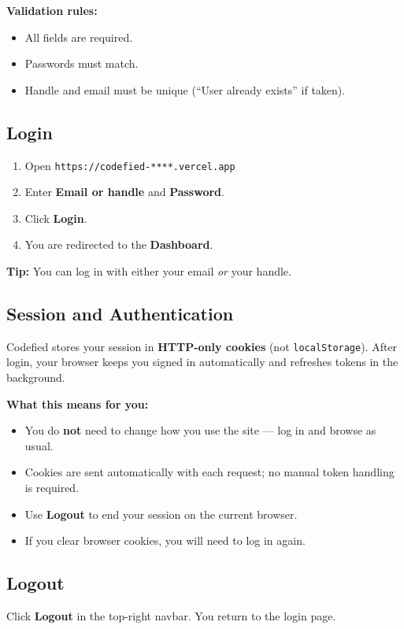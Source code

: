 \documentclass[11pt,a4paper]{article}
\newcommand{\appurl}{\texttt{https://codefied-****.vercel.app}}
\begin{document}
\textbf{Validation rules:}
\begin{itemize}[noitemsep]
  \item All fields are required.
  \item Passwords must match.
  \item Handle and email must be unique (``User already exists'' if taken).
\end{itemize}

\subsection{Login}
\begin{enumerate}
  \item Open \appurl
  \item Enter \textbf{Email or handle} and \textbf{Password}.
  \item Click \textbf{Login}.
  \item You are redirected to the \textbf{Dashboard}.
\end{enumerate}

\textbf{Tip:} You can log in with either your email \emph{or} your handle.

\subsection{Session and Authentication}
Codefied stores your session in \textbf{HTTP-only cookies} (not \texttt{localStorage}). After login, your browser keeps you signed in automatically and refreshes tokens in the background.

\textbf{What this means for you:}
\begin{itemize}[noitemsep]
  \item You do \textbf{not} need to change how you use the site --- log in and browse as usual.
  \item Cookies are sent automatically with each request; no manual token handling is required.
  \item Use \textbf{Logout} to end your session on the current browser.
  \item If you clear browser cookies, you will need to log in again.
\end{itemize}

\subsection{Logout}
Click \textbf{Logout} in the top-right navbar. You return to the login page.
\end{document}
